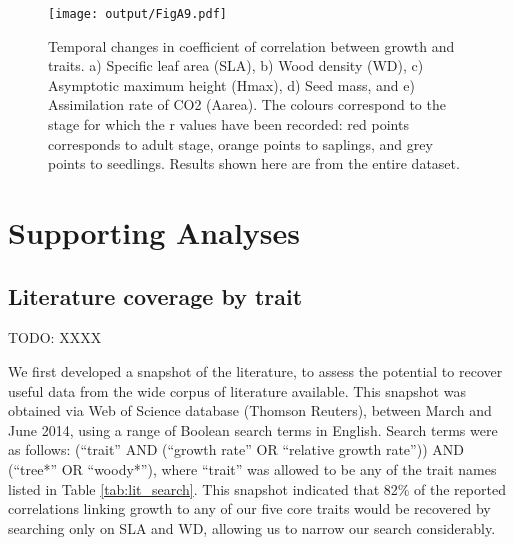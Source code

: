 \documentclass[a4paper,11pt]{article}
\begin{document}
\begin{appendices}
\begin{figure}[h!]
\centering
\texttt{[image: output/FigA9.pdf]}
\caption{Temporal changes in coefficient of correlation between growth and traits. a) Specific leaf area (SLA), b) Wood density (WD), c) Asymptotic maximum height (Hmax), d) Seed mass, and e) Assimilation rate of CO2 (Aarea). The colours correspond to the stage for which the r values have been recorded: red points corresponds to adult stage, orange points to saplings, and grey points to seedlings. Results shown here are from the entire dataset.}
\label{fig:figA9}
\end{figure}

\clearpage
\section{Supporting Analyses}\label{app:supp_info_analyses}

\subsection{Literature coverage by trait}\label{app:literature-snapshot}

TODO: XXXX

We first developed a snapshot of the literature, to assess the potential to recover useful data from the wide corpus of literature available. This snapshot was obtained via Web of Science database (Thomson Reuters), between March and June 2014, using a range of Boolean search terms in English. Search terms were as follows: (``trait'' AND (``growth rate'' OR ``relative growth rate'')) AND (``tree*'' OR ``woody*''), where ``trait'' was allowed to be any of the trait names listed in Table \ref{tab:lit_search}. This snapshot indicated that 82\% of the reported correlations linking growth to any of our five core traits would be recovered by searching only on SLA and WD, allowing us to narrow our search considerably.

\linespread{1}


\end{appendices}
\end{document}
